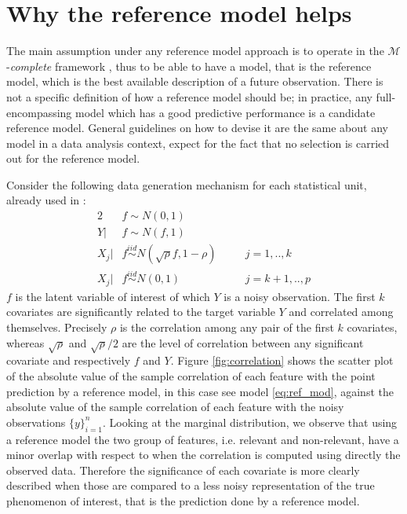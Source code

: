 \documentclass[american,]{article}
\theoremstyle{definition}
\begin{document}
\hypertarget{reference-model-approach}{%
\section{Why the reference model helps}\label{reference-model-approach}}

The main assumption under any reference model approach is to operate in  the $\mathcal{M}$-\textit{complete} framework \citep{book:bernardo_smith,paper:vehtari_ojanen}, thus to be able to have a model, that is the reference model, which is the best available description of a future observation. There is not a specific definition of how a reference model should be; in practice, any full-encompassing model which has a good predictive performance is a candidate reference model. General guidelines on how to devise it are the same about any model in a data analysis context, expect for the fact that no selection is carried out for the reference model.

Consider the following data generation mechanism for each statistical unit, already used in \cite{paper:projpred}:
\
\begin{alignat}{2} \label{eq:simulated_data}
     &f\sim N(0,1) && \nonumber \\ 
     Y|&f\sim N(f,1) && \\
     X_{j}|&f \overset{iid}{\sim} N(\sqrt{\rho}f,1-\rho) \quad &&j=1,..,k \nonumber \\
     X_{j}|&f \overset{iid}{\sim} N(0,1) &&j=k+1,..,p \nonumber
\end{alignat}
$f$ is the latent variable of interest of which $Y$ is a noisy observation. The first $k$ covariates are significantly related to the target variable $Y$ and correlated among themselves. Precisely $\rho$ is the correlation among any pair of the first $k$ covariates, whereas $\sqrt{\rho}$ and $\sqrt{\rho}/2$ are the level of correlation between any significant covariate and respectively $f$ and $Y$. Figure \ref{fig:correlation} shows the scatter plot of the absolute value of the sample correlation of each feature with the point prediction by a reference model, in this case see model \eqref{eq:ref_mod}, against the absolute value of the sample correlation of each feature with the noisy observations $\{y\}_{i=1}^{n}$. Looking at the marginal distribution, we observe that using a reference model the two group of features, i.e. relevant and non-relevant, have a minor overlap with respect to when the correlation is computed using directly the observed data. Therefore the significance of each covariate is more clearly described when those are compared to a less noisy representation of the true phenomenon of interest, that is the prediction done by a reference model. 
\end{document}
